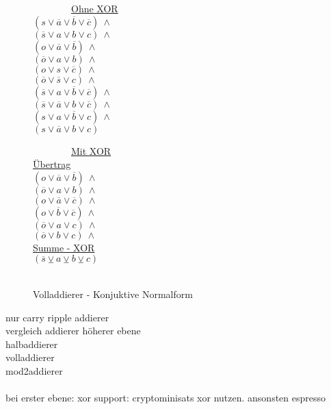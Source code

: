 \begin{figure}[!h]
  \centering
  \begin{minipage}[l]{5cm}
    ~~~~~~~~\underline{Ohne XOR}\\
    $ (s \vee \overline{a} \vee \overline{b} \vee \overline{c}) ~ \wedge $\\
    $ (\overline{s} \vee a \vee b \vee c) ~ \wedge $\\
    $ (o \vee \overline{a} \vee \overline{b}) ~ \wedge $\\
    $ (\overline{o} \vee a \vee b) ~ \wedge $\\
    $ (o \vee s \vee \overline{c}) ~ \wedge $\\
    $ (\overline{o} \vee \overline{s} \vee c) ~ \wedge $\\
    $ (\overline{s} \vee a \vee \overline{b} \vee \overline{c}) ~ \wedge $\\
    $ (\overline{s} \vee \overline{a} \vee b \vee \overline{c}) ~ \wedge $\\
    $ (s \vee a \vee \overline{b} \vee c) ~ \wedge $\\
    $ (s \vee \overline{a} \vee b \vee c) $
  \end{minipage}
  \begin{minipage}[l]{5cm}
    ~~~~~~~~\underline{Mit XOR}\\
    \underline{Übertrag}\\
    $ (o \vee \overline{a} \vee \overline{b}) ~ \wedge $\\
    $ (\overline{o} \vee a \vee b) ~ \wedge $\\
    $ (o \vee \overline{a} \vee \overline{c}) ~ \wedge $\\
    $ (o \vee \overline{b} \vee \overline{c}) ~ \wedge $\\
    $ (\overline{o} \vee a \vee c) ~ \wedge $\\
    $ (\overline{o} \vee b \vee c) ~ \wedge $\\
    \underline{Summe - XOR}\\
    $ (\overline{s} \veebar a \veebar b \veebar c) $\\
    ~
  \end{minipage}
  \caption{Volladdierer - Konjuktive Normalform}
  \label{fig:fulladder_cnf}
\end{figure}

nur carry ripple addierer\\
vergleich addierer höherer ebene\\
halbaddierer\\
volladdierer\\
mod2addierer\\
~\\
bei erster ebene: xor support: cryptominisats xor nutzen. ansonsten espresso